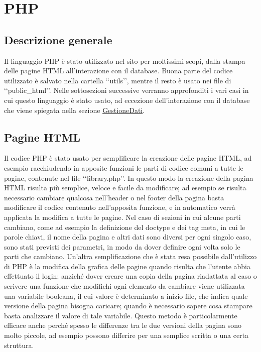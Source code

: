 \section{PHP}{
	\subsection{Descrizione generale}{
		Il linguaggio PHP è stato utilizzato nel sito per moltissimi scopi, dalla stampa delle pagine HTML all'interazione con il database. Buona parte del codice utilizzato è salvato nella cartella ‘‘utils’’, mentre il resto è usato nei file di ‘‘public_html’’. Nelle sottosezioni successive verranno approfonditi i vari casi in cui questo linguaggio è stato usato, ad eccezione dell'interazione con il database che viene spiegata nella sezione \hyperref[sec:PHPDB]{GestioneDati}.
	}
	\subsection{Pagine HTML}{
		Il codice PHP è stato usato per semplificare la creazione delle pagine HTML, ad esempio racchiudendo in apposite funzioni le parti di codice comuni a tutte le pagine, contenute nel file ‘‘library.php’’. In questo modo la creazione della pagina HTML risulta più semplice, veloce e facile da modificare; ad esempio se risulta necessario cambiare qualcosa nell'header o nel footer della pagina basta modificare il codice contenuto nell'apposita funzione, e in automatico verrà applicata la modifica a tutte le pagine. Nel caso di sezioni in cui alcune parti cambiano, come ad esempio la definizione del doctype e dei tag meta, in cui le parole chiavi, il nome della pagina e altri dati sono diversi per ogni singolo caso, sono stati previsti dei parametri, in modo da dover definire ogni volta solo le parti che cambiano.
		Un'altra semplificazione che è stata resa possibile dall'utilizzo di PHP è la modifica della grafica delle pagine quando risulta che l'utente abbia effettuato il login: anziché dover creare una copia della pagina riadattata al caso o scrivere una funzione che modifichi ogni elemento da cambiare viene utilizzata una variabile booleana, il cui valore è determinato a inizio file, che indica quale versione della pagina bisogna caricare; quando è necessario sapere cosa stampare basta analizzare il valore di tale variabile. Questo metodo è particolarmente efficace anche perché spesso le differenze tra le due versioni della pagina sono molto piccole, ad esempio possono differire per una semplice scritta o una certa struttura.
	}
}
